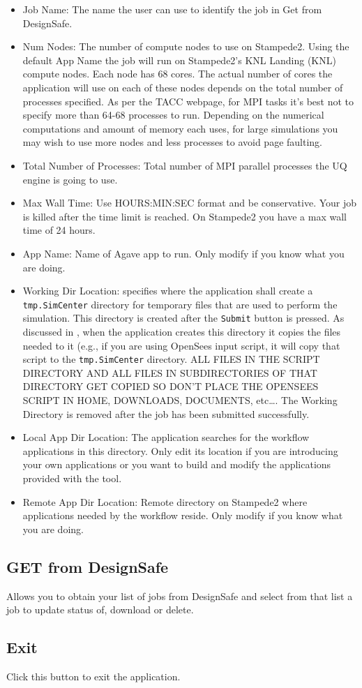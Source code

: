 \begin{itemize}
\item Job Name: The name the user can use to identify the job in Get from DesignSafe.
\item Num Nodes: The number of compute nodes to use on Stampede2. Using the default App Name the job will run on Stampede2’s KNL Landing (KNL) 
compute nodes. Each node has 68 cores. The actual number of cores the
application will use on each of these nodes depends on the total
number of processes specified. As per the TACC webpage, for MPI tasks
it’s best not to specify more than 64-68 processes to run. Depending
on the numerical computations and amount of memory each uses, for large simulations you may wish to use more nodes and less processes to
avoid page faulting.
\item Total Number of Processes: Total number of MPI parallel processes the UQ engine is going to use.
\item Max Wall Time: Use HOURS:MIN:SEC format and be conservative. Your job is killed after the time limit is reached. On Stampede2 you have a max wall time of 24 hours.
\item App Name: Name of Agave app to run. Only modify if you know what you are doing.
\item Working Dir Location: specifies where the \texttt{\getsoftwarename{}} application shall
create a \texttt{tmp.SimCenter} directory for temporary files that are used to perform the simulation. This directory is created after the \texttt{Submit} button is pressed. As discussed in , when
the application creates this directory it copies the files needed to it (e.g., if you are using OpenSees input script, it
will copy that script to the \texttt{tmp.SimCenter} directory. ALL FILES IN
THE SCRIPT DIRECTORY AND ALL FILES IN SUBDIRECTORIES OF THAT DIRECTORY GET
COPIED SO DON’T PLACE THE OPENSEES SCRIPT IN HOME, DOWNLOADS, DOCUMENTS, etc…. The Working Directory is removed after the job has been submitted successfully.
\item Local App Dir Location: The \texttt{\getsoftwarename{}} application searches for the workflow applications in this directory. Only edit its location if you are introducing your own applications or you want to build and modify the 
applications provided with the tool. 
\item Remote App Dir Location: Remote directory on Stampede2 where applications needed by the workflow reside. Only modify if you know what you are doing.

\end{itemize}

\subsection{GET from DesignSafe}
Allows you to obtain your list of jobs from DesignSafe and select from that list a job to update status of, download or delete.

\subsection{Exit}
Click this button to exit the application.